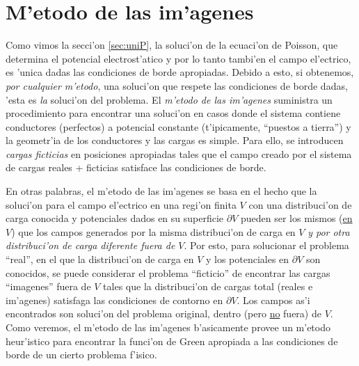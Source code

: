 \section{M'etodo de las im'agenes}
Como vimos la secci'on \ref{sec:uniP}, la soluci'on de la ecuaci'on de Poisson, que determina el potencial electrost'atico y por lo tanto tambi'en el campo el'ectrico, es 'unica dadas las condiciones de borde apropiadas. Debido a esto, si
obtenemos, \textit{por cualquier m'etodo}, una soluci'on que respete las condiciones de
borde dadas, 'esta es \textit{la} soluci'on del problema. El \textit{m'etodo de
las im'agenes} suministra un procedimiento para encontrar una soluci'on en
casos donde el sistema contiene conductores (perfectos) a potencial constante
(t'ipicamente, ``puestos a tierra'') y la geometr'ia de los conductores y las
cargas es simple. Para ello, se introducen \textit{cargas ficticias} en
posiciones apropiadas tales que el campo creado por el sistema de cargas reales
+ ficticias satisface las condiciones de borde.

En otras palabras, el m'etodo de las im'agenes se basa en el hecho que la
soluci'on para el campo el'ectrico en una regi'on finita $V$ con una
distribuci'on de carga conocida y potenciales dados en su superficie
$\partial V$ pueden ser los mismos (\underline{en $V$}) que los campos generados por la
misma distribuci'on de carga en $V$ \textit{y por otra distribuci'on de carga
diferente fuera de $V$}. Por esto, para solucionar el problema ``real'', en el
que la distribuci'on de carga en $V$ y los potenciales en $\partial V$ son conocidos, se
puede considerar el problema ``ficticio'' de encontrar las cargas ``imagenes''
fuera de $V$ tales que la distribuci'on de cargas total (reales e im'agenes)
satisfaga las condiciones de contorno en $\partial V$. Los campos as'i encontrados son
soluci'on del problema original, dentro (pero \underline{no} fuera) de $V$. Como veremos, el m'etodo de las im'agenes b'asicamente provee un m'etodo heur'istico para encontrar la funci'on de Green apropiada a las condiciones de borde de un cierto problema f'isico.



